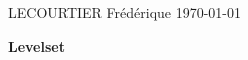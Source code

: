\documentclass[french]{article}
\begin{document}
	LECOURTIER Frédérique \hfill \today
	\begin{center}
		\Large\textbf{{Levelset}}
	\end{center}
	\tableofcontents
	\newpage
	\graphicspath{{images/1_introduction}}
	
	\newpage
	\graphicspath{{images/2_maths_theory}}
	
	\newpage
	\graphicspath{{images/3_learning}}
	
\end{document}
